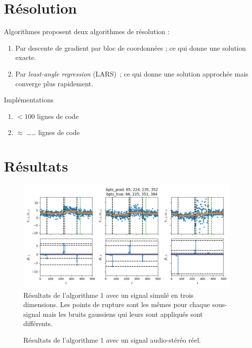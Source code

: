 \documentclass{beamer}
\theoremstyle{definition}
\begin{document}
\section{Résolution}
	\begin{frame}{\insertsection}
		\begin{block}{Algorithmes}
			\citet{gfl} proposent deux algorithmes de résolution :
			\begin{enumerate}
				\item Par descente de gradient par bloc de coordonnées ; ce qui donne une solution exacte.
				\item Par \textit{least-angle regression} (LARS) ; ce qui donne une solution approchée mais converge plus rapidement.
			\end{enumerate}
		\end{block}
	
		\begin{block}{Implémentations}
			\begin{enumerate}
				\item $<100$ lignes de code
				\item $\approx$ …… lignes de code
			\end{enumerate}
		\end{block}
	\end{frame}

\section{Résultats}
	\begin{frame}[allowframebreaks]{\insertsection}
		\begin{figure}
			\includegraphics[width=1\textwidth]{algo1simu.png}
			\caption{Résultats de l'algorithme 1 avec un signal simulé en trois dimensions. Les points de rupture sont les mêmes pour chaque sous-signal mais les bruits gaussiens qui leurs sont appliqués sont différents.}
			\label{fig:algo1simu}
		\end{figure}
	
		\begin{figure}
			\caption{Résultats de l'algorithme 1 avec un signal audio-stéréo réel.}
			\label{fig:algo1real}
		\end{figure}
	\end{frame}
\end{document}
